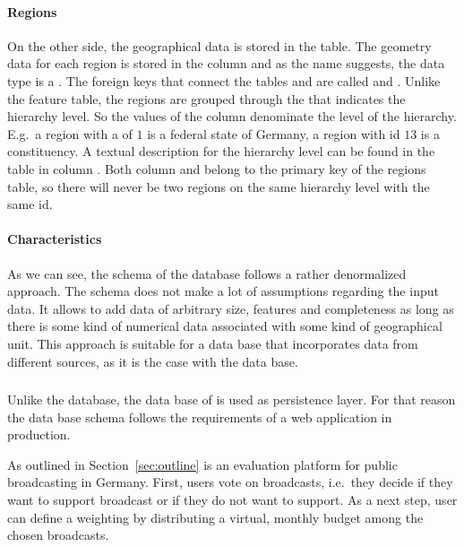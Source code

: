 \paragraph{Regions}
On the other side, the geographical data is stored in the  table.
The geometry data for each region is stored in the  column and as the name suggests, the data type is a .
The foreign keys that connect the tables  and  are called  and .
Unlike the feature table, the regions are grouped through the  that indicates the hierarchy level.
So the values of the  column denominate the level of the hierarchy.
E.g.\ a region with a  of $1$ is a federal state of Germany, a region with id $13$ is a constituency.
A textual description for the hierarchy level can be found in the  table in column .
Both column  and  belong to the primary key of the regions table, so there will never be two regions on the same hierarchy level with the same  id.

\paragraph{Characteristics}
As we can see, the schema of the \riso{} database follows a rather denormalized approach.
The schema does not make a lot of assumptions regarding the input data.
It allows to add data of arbitrary size, features and completeness as long as there is some kind of numerical data associated with some kind of geographical unit.
This approach is suitable for a data base that incorporates data from different sources, as it is the case with the \riso{} data base.


\subsubsection{\rufu{}}
Unlike the \riso{} database, the data base of \rufu{} is used as persistence layer.
For that reason the data base schema follows the requirements of a web application in production.

As outlined in Section~\ref{sec:outline} \rufu{} is an evaluation platform for public broadcasting in Germany.
First, users vote on broadcasts, i.e.\ they decide if they want to support broadcast or if they do not want to support.
As a next step, user can define a weighting by distributing a virtual, monthly budget among the chosen broadcasts.

